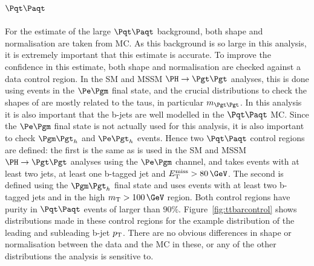 \subsection{$\ttbar$}

For the estimate of the large $\ttbar$ background, both shape and normalisation
are taken from \ac{MC}. As this background is so large in this analysis, it
is extremely important that this estimate is accurate. To improve the confidence
in this estimate, both shape and normalisation are checked against a data
control region. In the \ac{SM} and \ac{MSSM} $\HToTauTau$ analyses, this is done
using events in the $\emu$ final state, and the crucial distributions to check
the shapes of are mostly related to the taus, in particular $m_{\Pgt\Pgt}$. In this
analysis it is also important that the b-jets are well modelled in the
$\ttbar$ \ac{MC}. Since the $\emu$ final state is not actually used for this
analysis, it is also important to check $\mutau$ and $\etau$ events.
Hence two $\ttbar$ control regions are defined: the first is the same as is used
in the \ac{SM} and \ac{MSSM} $\HToTauTau$ analyses using the $\emu$ channel, 
and takes events with at least two jets, at least one b-tagged jet and
$\MET>80\,\GeV$. The second is defined using the
$\mutau$ final state and uses events with at least two b-tagged jets and in the
high $m_{\text{T}}>100\,\GeV$ region. Both control regions have purity in
$\ttbar$ events of larger than $90\%$. Figure~\ref{fig:ttbarcontrol} shows
distributions made in these control regions for the example distribution of the
leading and subleading b-jet $p_{\mathrm{T}}$. There are no obvious differences in shape or
normalisation between the data and the \ac{MC} in these, or any of the other
distributions the analysis is sensitive to.

